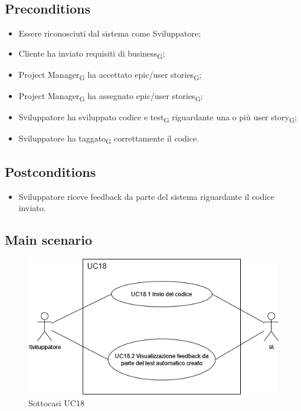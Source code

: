 \documentclass{article}
\begin{document}
    \subsection*{Preconditions}
        \begin{itemize}
            \item Essere riconosciuti dal sistema come Sviluppatore;
            \item Cliente ha inviato requisiti di business\textsubscript{G};
            \item Project Manager\textsubscript{G} ha accettato epic/user stories\textsubscript{G};
            \item Project Manager\textsubscript{G} ha assegnato epic/user stories\textsubscript{G};
            \item Sviluppatore ha sviluppato codice e test\textsubscript{G} riguardante una o più user story\textsubscript{G};
            \item Sviluppatore ha taggato\textsubscript{G} correttamente il codice.
        \end{itemize}
        
    \subsection*{Postconditions}
        \begin{itemize}
            \item Sviluppatore riceve feedback da parte del sistema riguardante il codice inviato.
        \end{itemize}
    
    \subsection*{Main scenario}
        \begin{figure}[h]
          \centering
          \includegraphics[width=.8\textwidth, height=.6\textheight, keepaspectratio]{documenti/imgUML/UC18-zoom.drawio.png}
          \caption{Sottocasi UC18}
          \label{fig:UC18_sottocasi}
        \end{figure}
        
\end{document}
